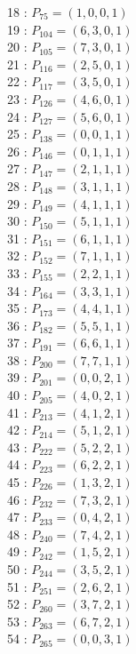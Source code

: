 \documentclass{article}
\begin{document}
{\begin{multicols}{3}
18 : $P_{75}=( 1, 0, 0, 1 )$\\
19 : $P_{104}=( 6, 3, 0, 1 )$\\
20 : $P_{105}=( 7, 3, 0, 1 )$\\
21 : $P_{116}=( 2, 5, 0, 1 )$\\
22 : $P_{117}=( 3, 5, 0, 1 )$\\
23 : $P_{126}=( 4, 6, 0, 1 )$\\
24 : $P_{127}=( 5, 6, 0, 1 )$\\
25 : $P_{138}=( 0, 0, 1, 1 )$\\
26 : $P_{146}=( 0, 1, 1, 1 )$\\
27 : $P_{147}=( 2, 1, 1, 1 )$\\
28 : $P_{148}=( 3, 1, 1, 1 )$\\
29 : $P_{149}=( 4, 1, 1, 1 )$\\
30 : $P_{150}=( 5, 1, 1, 1 )$\\
31 : $P_{151}=( 6, 1, 1, 1 )$\\
32 : $P_{152}=( 7, 1, 1, 1 )$\\
33 : $P_{155}=( 2, 2, 1, 1 )$\\
34 : $P_{164}=( 3, 3, 1, 1 )$\\
35 : $P_{173}=( 4, 4, 1, 1 )$\\
36 : $P_{182}=( 5, 5, 1, 1 )$\\
37 : $P_{191}=( 6, 6, 1, 1 )$\\
38 : $P_{200}=( 7, 7, 1, 1 )$\\
39 : $P_{201}=( 0, 0, 2, 1 )$\\
40 : $P_{205}=( 4, 0, 2, 1 )$\\
41 : $P_{213}=( 4, 1, 2, 1 )$\\
42 : $P_{214}=( 5, 1, 2, 1 )$\\
43 : $P_{222}=( 5, 2, 2, 1 )$\\
44 : $P_{223}=( 6, 2, 2, 1 )$\\
45 : $P_{226}=( 1, 3, 2, 1 )$\\
46 : $P_{232}=( 7, 3, 2, 1 )$\\
47 : $P_{233}=( 0, 4, 2, 1 )$\\
48 : $P_{240}=( 7, 4, 2, 1 )$\\
49 : $P_{242}=( 1, 5, 2, 1 )$\\
50 : $P_{244}=( 3, 5, 2, 1 )$\\
51 : $P_{251}=( 2, 6, 2, 1 )$\\
52 : $P_{260}=( 3, 7, 2, 1 )$\\
53 : $P_{263}=( 6, 7, 2, 1 )$\\
54 : $P_{265}=( 0, 0, 3, 1 )$\\

\end{multicols}}
\end{document}
